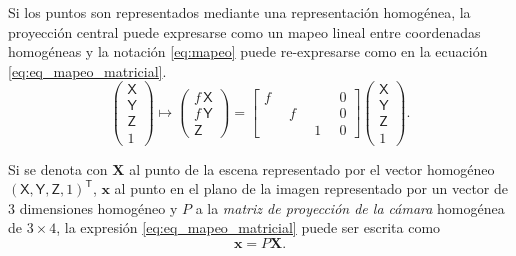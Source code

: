 Si los puntos son representados mediante una representación homogénea, la proyección central puede expresarse como un mapeo lineal entre coordenadas homogéneas y la notación \eqref{eq:mapeo} puede re-expresarse como en la ecuación \eqref{eq:eq_mapeo_matricial}.
\begin{equation}
\label{eq:eq_mapeo_matricial}
\left(\begin{array}{c}
\mathsf{X}\\
\mathsf{Y}\\
\mathsf{Z}\\
1
\end{array}\right)\mapsto\left(\begin{array}{c}
f\, \mathsf{X}\\
f\, \mathsf{Y}\\
\mathsf{Z}
\end{array}\right)=\left[\begin{array}{cccc}
f & \quad & \quad & 0\\
\quad & f & \quad & 0\\
\quad & \quad & 1 & 0
\end{array}\right]\left(\begin{array}{c}
\mathsf{X}\\
\mathsf{Y}\\
\mathsf{Z}\\
1
\end{array}\right).
\end{equation}

Si se denota con $\mathbf{X}$ al punto de la escena representado por el vector homogéneo $(\mathsf{X},\mathsf{Y},\mathsf{Z},1)^\mathsf{T}$, $\mathbf{x}$ al punto en el plano de la imagen representado por un vector de 3 dimensiones homogéneo y $P$ a la \textit{matriz de proyección de la cámara} homogénea de $3 \times 4$, la expresión \ref{eq:eq_mapeo_matricial} puede ser escrita como
\begin{equation}
 \label{eq:eq_mapeo_matricial_notacion}
  \mathbf{x}=P \mathbf{X}.
\end{equation}

